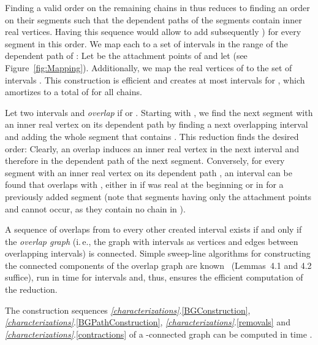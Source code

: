 Finding a valid order on the remaining chains in  thus reduces to finding an order on their segments such that the dependent paths of the segments contain inner real vertices. Having this sequence would allow to add subsequently ) for every segment  in this order. We map each  to a set  of intervals in the range of the dependent path  of : Let  be the attachment points of  and let  (see Figure~\ref{fig:Mapping}). Additionally, we map the real vertices  of  to the set of intervals . This construction is efficient and creates at most  intervals for , which amortizes to a total of  for all chains.

Let two intervals  and  \emph{overlap} if  or . Starting with , we find the next segment with an inner real vertex on its dependent path by finding a next overlapping interval  and adding the whole segment that contains . This reduction finds the desired order: Clearly, an overlap induces an inner real vertex in the next interval and therefore in the dependent path of the next segment. Conversely, for every segment  with an inner real vertex on its dependent path , an interval can be found that overlaps with , either in  if  was real at the beginning or in  for a previously added segment  (note that segments having only the attachment points  and  cannot occur, as they contain no chain in ).

A sequence of overlaps from  to every other created interval exists if and only if the \emph{overlap graph} (i.\,e., the graph with intervals as vertices and edges between overlapping intervals) is connected. Simple sweep-line algorithms for constructing the connected components of the overlap graph are known~\cite{Olariu1996} (Lemmas~4.1 and 4.2 suffice), run in time  for  intervals and, thus, ensures the efficient computation of the reduction.

\begin{theorem}
The construction sequences \emph{\ref{characterizations}}.\eqref{BGConstruction}, \emph{\ref{characterizations}}.\eqref{BGPathConstruction}, \emph{\ref{characterizations}}.\eqref{removals} and \emph{\ref{characterizations}}.\eqref{contractions} of a -connected graph can be computed in time .
\end{theorem}



